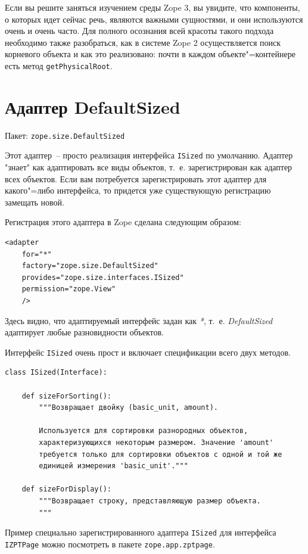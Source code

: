 \documentclass[a4paper,openany,twoside,final]{book}
\providecommand*{\DUroletitlereference}[1]{\textsl{#1}}
\begin{document}
Если вы решите заняться изучением среды Zope 3, вы увидите, что компоненты, о которых идет сейчас речь, являются важными сущностями, и они используются очень и очень часто.  Для полного осознания всей красоты такого подхода необходимо также разобраться, как в системе Zope 2 осуществляется поиск корневого объекта и как это реализовано: почти в каждом объекте"=контейнере есть метод \texttt{getPhysicalRoot}.


\section{Адаптер DefaultSized%
  \label{defaultsized}%
}

Пакет: \texttt{zope.size.DefaultSized}

Этот адаптер~-- просто реализация интерфейса \texttt{ISized} по умолчанию.  Адаптер "знает" как адаптировать все виды объектов, т.~е. зарегистрирован как адаптер всех объектов.  Если вам потребуется зарегистрировать этот адаптер для какого"=либо интерфейса, то придется уже существующую регистрацию замещать новой.

Регистрация этого адаптера в Zope сделана следующим образом:

\begin{verbatim}
<adapter
    for="*"
    factory="zope.size.DefaultSized"
    provides="zope.size.interfaces.ISized"
    permission="zope.View"
    />
\end{verbatim}

Здесь видно, что адаптируемый интерфейс задан как \DUroletitlereference{*}, т.~е. \DUroletitlereference{DefaultSized} адаптирует любые разновидности объектов.

Интерфейс \texttt{ISized} очень прост и включает спецификации всего двух методов.

\begin{verbatim}
class ISized(Interface):

    def sizeForSorting():
        """Возвращает двойку (basic_unit, amount).

        Используется для сортировки разнородных объектов,
        характеризующихся некоторым размером. Значение 'amount'
        требуется только для сортировки объектов с одной и той же
        единицей измерения 'basic_unit'."""

    def sizeForDisplay():
        """Возвращает строку, представляющую размер объекта.
        """
\end{verbatim}

Пример специально зарегистрированного адаптера \texttt{ISized} для интерфейса \texttt{IZPTPage} можно посмотреть в пакете \texttt{zope.app.zptpage}.
\end{document}
